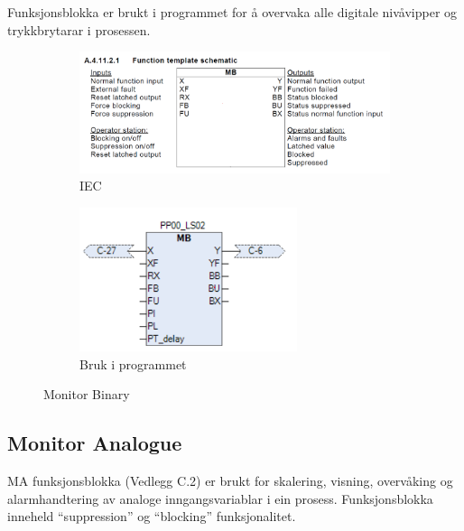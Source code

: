 Funksjonsblokka er brukt i programmet for å overvaka alle digitale nivåvipper og trykkbrytarar i prosessen.


\begin{figure}[htbp]
    \centering
    \begin{subfigure}[b]{0.45\textwidth}
        \centering
        \includegraphics[width=1\textwidth]{Bilder/MBBlokkIEC.png}
        \caption{IEC}\label{fig:Monitor Binary blokk IEC}
    \end{subfigure}
    \hfill
    \begin{subfigure}[b]{0.45\textwidth}
        \centering
        \includegraphics[width=0.7\textwidth]{Bilder/MBBlokkIProgrammet.png}
        \caption{Bruk i programmet}\label{fig:Monitor Binary blokk i programmet}
    \end{subfigure}
    \caption{Monitor Binary}\label{fig:Monitor Binary}
\end{figure}

\subsection{Monitor Analogue}
\gls{MA} funksjonsblokka (Vedlegg C.2) er brukt for skalering, visning, overvåking og alarmhandtering av \newline
analoge inngangsvariablar i ein prosess.
Funksjonsblokka inneheld ``suppression'' og ``blocking'' funksjonalitet.

